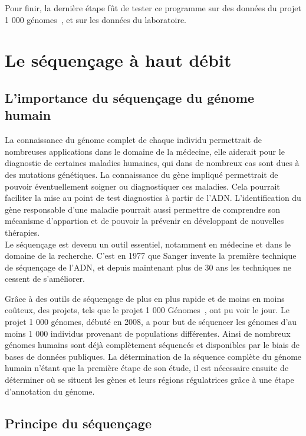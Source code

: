 \documentclass[a4paper,12pt]{article}
\begin{document}
Pour finir, la dernière étape fût de tester ce programme sur des données du projet 1 000 génomes~\cite{1000Genomes}, et sur les données du laboratoire.


\section{Le séquençage à haut débit}

\subsection{L'importance du séquençage du génome humain}

La connaissance du génome complet de chaque individu permettrait de nombreuses applications dans le domaine de la médecine, elle aiderait pour le diagnostic de certaines maladies humaines, qui dans de nombreux cas sont dues à des mutations génétiques. La connaissance du gène impliqué permettrait de pouvoir éventuellement soigner ou diagnostiquer ces maladies. Cela pourrait faciliter la mise au point de test diagnostics à partir de l'ADN. L'identification du gène responsable d'une maladie pourrait aussi permettre de comprendre son mécanisme d'appartion et de pouvoir la prévenir en développant de nouvelles thérapies. \\
Le séquençage est devenu un outil essentiel, notamment en médecine et dans le domaine de la recherche. C'est en 1977 que Sanger invente la première technique de séquençage de l'ADN, et depuis maintenant plus de 30 ans les techniques ne cessent de s'améliorer. 

Grâce à des outils de séquençage de plus en plus rapide et de moins en moins coûteux, des projets, tels que le projet 1 000 Génomes~\cite{1000Genomes}, ont pu voir le jour. Le projet 1 000 génomes, débuté en 2008, a pour but de séquencer les génomes d'au moins 1 000 individus provenant de populations différentes. Ainsi de nombreux génomes humains sont déjà complètement séquencés et disponibles par le biais de bases de données publiques. La détermination de la séquence complète du génome humain n'étant que la première étape de son étude, il est nécessaire ensuite de déterminer où se situent les gènes et leurs régions régulatrices grâce à une étape d'annotation du génome. 

\subsection{Principe du séquençage }
\end{document}
